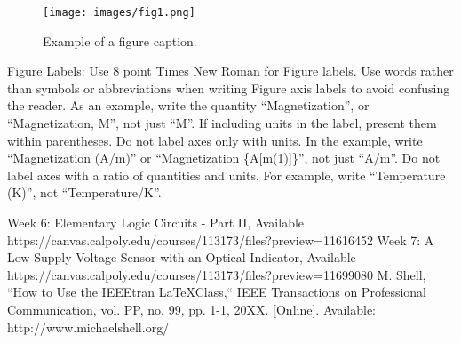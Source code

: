 \documentclass[conference]{IEEEtran}
\begin{document}
\begin{figure}[htbp]
\centerline{\texttt{[image: images/fig1.png]}}
\caption{Example of a figure caption.}
\label{fig}
\end{figure}

Figure Labels: Use 8 point Times New Roman for Figure labels. Use words 
rather than symbols or abbreviations when writing Figure axis labels to 
avoid confusing the reader. As an example, write the quantity 
``Magnetization'', or ``Magnetization, M'', not just ``M''. If including 
units in the label, present them within parentheses. Do not label axes only 
with units. In the example, write ``Magnetization (A/m)'' or ``Magnetization 
\{A[m(1)]\}'', not just ``A/m''. Do not label axes with a ratio of 
quantities and units. For example, write ``Temperature (K)'', not 
``Temperature/K''.

\begin{thebibliography}{00}
 Week 6: Elementary Logic Circuits - Part II, Available https://canvas.calpoly.edu/courses/113173/files?preview=11616452
 Week 7: A Low-Supply Voltage Sensor with an Optical Indicator, Available https://canvas.calpoly.edu/courses/113173/files?preview=11699080
 M. Shell, ``How to Use the IEEEtran \LaTeX Class,`` IEEE Transactions on Professional Communication, vol. PP, no. 99, pp. 1-1, 20XX. [Online]. Available: http://www.michaelshell.org/
\end{thebibliography}
\vspace{12pt}
\end{document}
